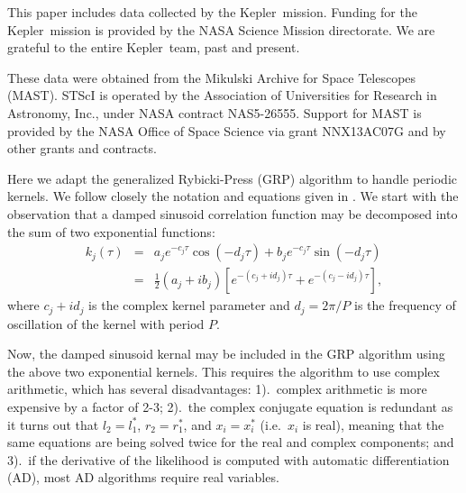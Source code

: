 \documentclass[manuscript, letterpaper]{aastex6}
\makeatletter
\let\origsection\section
\renewcommand\section{\@ifstar{\starsection}{\nostarsection}}
\newcommand\nostarsection[1]{\sectionprelude\origsection{#1}}
\newcommand\starsection[1]{\sectionprelude\origsection*{#1}}
\newcommand\sectionprelude{\vspace{1em}}
\newcommand{\project}[1]{\textsf{#1}}
\newcommand{\kepler}{\project{Kepler}}
\newcommand{\sectlabel}[1]{\label{sect:#1}}
\makeatother
\begin{document}
This paper includes data collected by the \kepler\ mission. Funding for the
\kepler\ mission is provided by the NASA Science Mission directorate.
We are grateful to the entire \kepler\ team, past and present.

These data were obtained from the Mikulski Archive for Space Telescopes
(MAST).
STScI is operated by the Association of Universities for Research in
Astronomy, Inc., under NASA contract NAS5-26555.
Support for MAST is provided by the NASA Office of Space Science via grant
NNX13AC07G and by other grants and contracts.

\software{%
}

\appendix

\section{Implementation details}\sectlabel{implementation}

Here we adapt the generalized Rybicki-Press (GRP) algorithm to handle periodic kernels.  We
follow closely the notation and equations given in \citet{Ambikasaran:2015}.  We start
with the observation that a damped sinusoid correlation function may be decomposed into the sum of two
exponential functions:
\begin{eqnarray}
k_j(\tau) &=& a_j e^{-c_j\tau} \cos{(-d_j\tau)} + b_j e^{-c_j\tau} \sin{(-d_j \tau)}\\
 &=& \frac{1}{2}(a_j+ib_j)\left[e^{-(c_j+id_j) \tau}+e^{-(c_j-id_j) \tau}\right],
\end{eqnarray}
where $c_j + id_j$ is the complex kernel parameter and $d_j = 2\pi/P$
is the frequency of oscillation of the kernel with period $P$.

Now, the damped sinusoid kernal may be included in the GRP algorithm
using the above two exponential kernels.  This
requires the algorithm to use complex arithmetic, which has several disadvantages:
1).\ complex arithmetic is more expensive by a factor of 2-3; 2).\ the complex conjugate equation
is redundant as it turns out that $l_2 = l_1^*$, $r_2 = r_1^*$, and $x_i = x_i^*$ (i.e.\ $x_i$ is
real), meaning that the same equations are being solved twice for the real and complex components;
and 3).\ if the derivative of the likelihood is computed with automatic
differentiation (AD), most AD algorithms require real variables.
\end{document}
